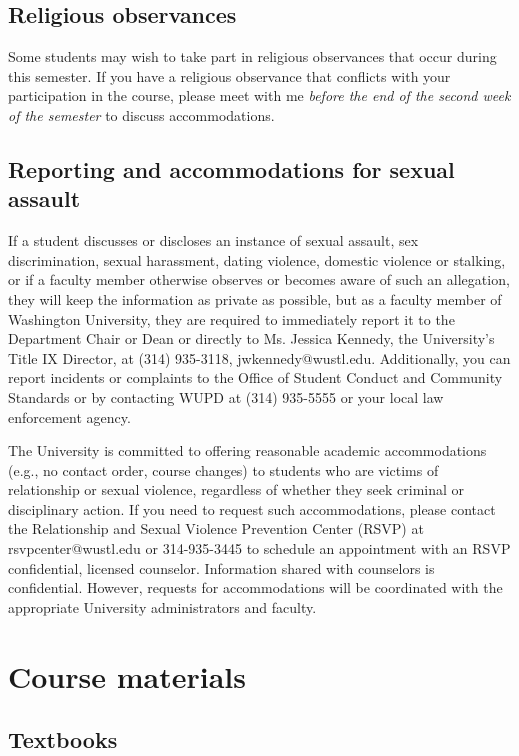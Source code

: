 \documentclass[11pt]{article}
\begin{document}
\subsection*{Religious observances}

Some students may wish to take part in religious observances that
occur during this semester. If you have a religious observance
that conflicts with your participation in the course, please meet with
me \emph{before the end of the second week of the semester} to discuss
accommodations.


\subsection*{Reporting and accommodations for sexual assault}

If a student discusses or discloses an instance of sexual assault, sex discrimination, sexual harassment, dating violence, domestic violence or stalking, or if a faculty member otherwise observes or becomes aware of such an allegation, they will keep the information as private as possible, but as a faculty member of Washington University, they are required to immediately report it to the Department Chair or Dean or directly to Ms. Jessica Kennedy, the University’s Title IX Director, at (314) 935-3118, jwkennedy@wustl.edu.  Additionally, you can report incidents or complaints to the Office of Student Conduct and Community Standards or by contacting WUPD at (314) 935-5555 or your local law enforcement agency. 

The University is committed to offering reasonable academic accommodations (e.g., no contact order, course changes) to students who are victims of relationship or sexual violence, regardless of whether they seek criminal or disciplinary action.  If you need to request such accommodations, please contact the Relationship and Sexual Violence Prevention Center (RSVP) at rsvpcenter@wustl.edu or 314-935-3445 to schedule an appointment with an RSVP confidential, licensed counselor. Information shared with counselors is confidential. However, requests for accommodations will be coordinated with the appropriate University administrators and faculty.  




\section*{Course materials}

\subsection*{Textbooks}
\end{document}
